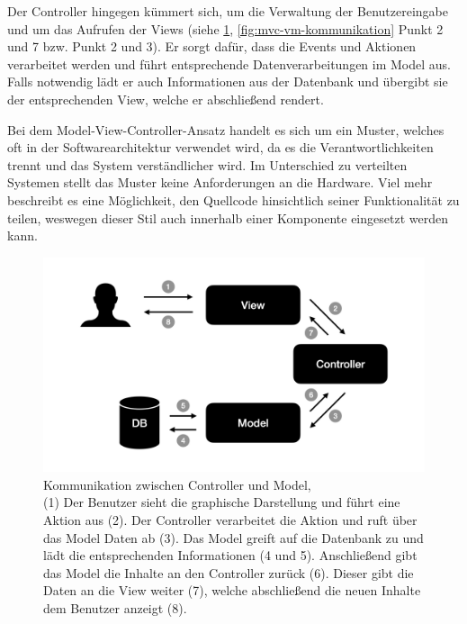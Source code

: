Der Controller hingegen kümmert sich, um die Verwaltung der Benutzereingabe und um das Aufrufen der Views (siehe \cref{fig:mvc-cm-kommunikation}, \cref{fig:mvc-vm-kommunikation} Punkt 2 und 7 bzw. Punkt 2 und 3). Er sorgt dafür, dass die Events und Aktionen verarbeitet werden und führt entsprechende Datenverarbeitungen im Model aus. Falls notwendig lädt er auch Informationen aus der Datenbank und übergibt sie der entsprechenden View, welche er abschließend rendert.

Bei dem Model-View-Controller-Ansatz handelt es sich um ein Muster, welches oft in der Softwarearchitektur verwendet wird, da es die Verantwortlichkeiten trennt und das System verständlicher wird.
Im Unterschied zu verteilten Systemen stellt das Muster keine Anforderungen an die Hardware. Viel mehr beschreibt es eine Möglichkeit, den Quellcode hinsichtlich seiner Funktionalität zu teilen, weswegen dieser Stil auch innerhalb einer Komponente eingesetzt werden kann.

\begin{figure}
	\centering
	\includegraphics[width=.6\textwidth]{Assets/Interaktionsorientiert.001}
	\caption[Kommunikation zwischen Controller und Model]{Kommunikation zwischen Controller und Model, \\ (1) Der Benutzer sieht die graphische Darstellung und führt eine Aktion aus (2). Der Controller verarbeitet die Aktion und ruft über das Model Daten ab (3). Das Model greift auf die Datenbank zu und lädt die entsprechenden Informationen (4 und 5). Anschließend gibt das Model die Inhalte an den Controller zurück (6). Dieser gibt die Daten an die View weiter (7), welche abschließend die neuen Inhalte dem Benutzer anzeigt (8).}
	\label{fig:mvc-cm-kommunikation}
 \end{figure}
 
